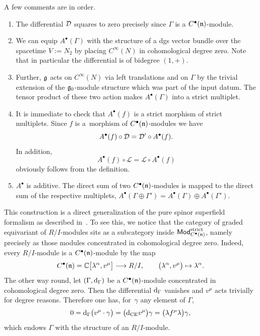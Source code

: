 \documentclass[pdftex]{sigma}
\numberwithin{equation}{section}
\def\cat#1{\ensuremath{\mathsf{#1}}}
\DeclareMathOperator{\Mod}{\cat{Mod}}
\def\d{{\rm d}}
\def\sL{\mathscr L}
\begin{document}
A few comments are in order.

\begin{enumerate}\itemsep=0pt
	\item The differential $\mathcal D$ squares to zero precisely since $\Gamma$ is a $C^\bullet(\mathfrak n)$-module.
	\item We can equip $A^\bullet(\Gamma)$ with the structure of a dgs vector bundle over the spacetime $V := N_2$ by placing $C^\infty(N)$ in cohomological degree zero. Note that in particular the differential is of bidegree $(1,+)$.
	
	\item Further, $\mathfrak g$ acts on $C^\infty(N)$ via left translations and on $\Gamma$ by the trivial extension of the $\mathfrak g_0$-module structure which was part of the input datum. The tensor product of these two action makes $A^\bullet(\Gamma)$ into a strict multiplet.
	\item It is immediate to check that $A^\bullet(f)$ is a strict morphism of strict multiplets. Since $f$ is a~morphism of $C^\bullet(\mathfrak n)$-modules we have
	\begin{equation*}
	A^\bullet(f) \circ \mathcal D = \mathcal D' \circ A^\bullet(f) .
	\end{equation*}
	In addition,
	\begin{equation*}
	A^\bullet(f) \circ \sL = \sL \circ A^\bullet(f)
	\end{equation*}
	obviously follows from the definition.
	\item $A^\bullet$ is additive. The direct sum of two $C^\bullet(\mathfrak n)$-modules is mapped to the direct sum of the respective multiplets, $A^\bullet(\Gamma \oplus \Gamma') = A^\bullet(\Gamma) \oplus A^\bullet(\Gamma')$.
\end{enumerate}

This construction is a direct generalization of the pure spinor superfield formalism as described in~\cite{perspectives}. To see this, we notice that the category of graded equivariant of $R/I$-modules sits as a subcategory inside $\Mod_{C^\bullet(\fn)}^{\mathrm{strict}}$, namely precisely as those modules concentrated in cohomological degree zero. Indeed, every $R/I$-module is a $C^\bullet(\mathfrak n)$-module by the map
\begin{equation*}
C^\bullet(\mathfrak n) = \mathbb C\big[\lambda^\alpha,v^\mu\big] \longrightarrow R/I, \qquad \big(\lambda^\alpha , v^\mu\big) \mapsto \lambda^\alpha .
\end{equation*}
The other way round, let $(\Gamma , \d_\Gamma)$ be a $C^\bullet(\mathfrak n)$-module concentrated in cohomological degree zero. Then the differential $\d_\Gamma$ vanishes and $v^\mu$ acts trivially for degree reasons. Therefore one has, for~$\gamma$ any element of $\Gamma$,
\begin{equation*}
0 = \d_\Gamma \big(v^\mu \cdot \gamma\big) = \big(\d_{\mathrm{CE}} v^\mu\big) \gamma = \big(\lambda f^\mu \lambda\big) \gamma ,
\end{equation*}
which endows $\Gamma$ with the structure of an $R/I$-module.
\end{document}

